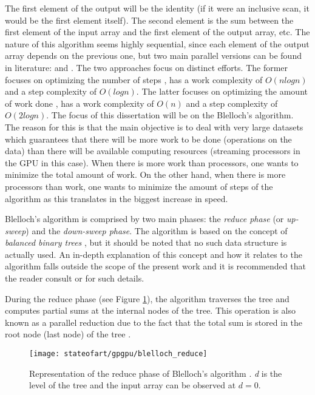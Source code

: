 The first element of the output will be the identity (if it were an inclusive scan, it would be the first element itself).
The second element is the sum between the first element of the input array and the first element of the output array, etc.
The nature of this algorithm seems highly sequential, since each element of the output array depends on the previous one, but two main parallel versions can be found in literature: \citet{Hillis1986} and \citet{Blelloch1990}. 
The two approaches focus on distinct efforts.
The former focuses on optimizing the number of steps \cite{Hillis1986}, has a work complexity of $O(nlogn)$ and a step complexity of $O(logn)$.
The latter focuses on optimizing the amount of work done \cite{Blelloch1990}, has a work complexity of $O(n)$ and a step complexity of $O(2logn)$.
The focus of this dissertation will be on the Blelloch's algorithm.
The reason for this is that the main objective is to deal with very large datasets which guarantees that there will be more work to be done (operations on the data) than there will be available computing resources (streaming processors in the GPU in this case).
When there is more work than processors, one wants to minimize the total amount of work.
On the other hand, when there is more processors than work, one wants to minimize the amount of steps of the algorithm as this translates in the biggest increase in speed.



Blelloch's algorithm is comprised by two main phases: the \emph{reduce phase} (or \emph{up-sweep}) and the \emph{down-sweep phase}.
The algorithm is based on the concept of \emph{balanced binary trees} \cite{Harris2007}, but it should be noted that no such data structure is actually used.
An in-depth explanation of this concept and how it relates to the algorithm falls outside the scope of the present work and it is recommended that the reader consult \cite{Harris2007} or \cite{Blelloch1990} for such details.

During the reduce phase (see Figure \ref{fig:scan reduce}), the algorithm traverses the tree and computes partial sums at the internal nodes of the tree.
This operation is also known as a parallel reduction due to the fact that the total sum is stored in the root node (last node) of the tree \cite{Harris2007}.

\begin{figure}[hbtp]
\centering
\texttt{[image: stateofart/gpgpu/blelloch\_reduce]}
\caption{Representation of the reduce phase of Blelloch's algorithm \cite{Harris2007}. \emph{d} is the level of the tree and the input array can be observed at $d=0$.}
\label{fig:scan reduce}
\end{figure}

